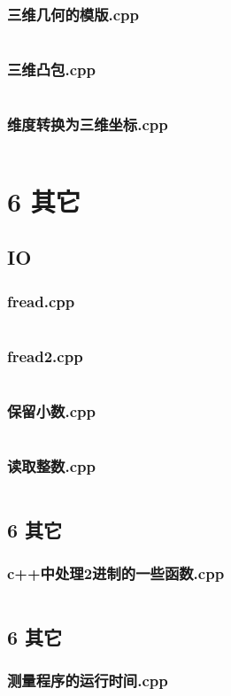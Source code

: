 \documentclass{article}
\begin{document}
\subsubsection{三维几何的模版.cpp}
\inputminted{c++}{/home/zzuzxy/t2/ACM-template/5 几何/3D/三维几何的模版.cpp}
\subsubsection{三维凸包.cpp}
\inputminted{c++}{/home/zzuzxy/t2/ACM-template/5 几何/3D/三维凸包.cpp}
\subsubsection{维度转换为三维坐标.cpp}
\inputminted{c++}{/home/zzuzxy/t2/ACM-template/5 几何/3D/维度转换为三维坐标.cpp}
\section{6 其它}
\subsection{IO}
\subsubsection{fread.cpp}
\inputminted{c++}{/home/zzuzxy/t2/ACM-template/6 其它/IO/fread.cpp}
\subsubsection{fread2.cpp}
\inputminted{c++}{/home/zzuzxy/t2/ACM-template/6 其它/IO/fread2.cpp}
\subsubsection{保留小数.cpp}
\inputminted{c++}{/home/zzuzxy/t2/ACM-template/6 其它/IO/保留小数.cpp}
\subsubsection{读取整数.cpp}
\inputminted{c++}{/home/zzuzxy/t2/ACM-template/6 其它/IO/读取整数.cpp}
\subsection{6 其它}
\subsubsection{c++中处理2进制的一些函数.cpp}
\inputminted{c++}{/home/zzuzxy/t2/ACM-template/6 其它/c++中处理2进制的一些函数.cpp}
\subsection{6 其它}
\subsubsection{测量程序的运行时间.cpp}
\inputminted{c++}{/home/zzuzxy/t2/ACM-template/6 其它/测量程序的运行时间.cpp}
\end{document}
